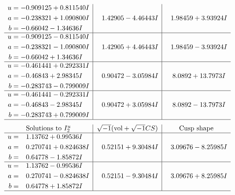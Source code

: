 \documentclass[1p]{elsarticle_modified}
\theoremstyle{definition}
\newcommand{\I}{\sqrt{-1}}
\begin{document}
$$\begin{array}{c|c|c}
\begin{aligned}
u &= -0.909125 + 0.811540 I \\
a &= -0.238321 + 1.090800 I \\
b &= -0.66042 - 1.34636 I\end{aligned}
 & \phantom{-}1.42905 - 4.46443 I & \phantom{-}1.98459 + 3.93924 I \\ \hline\begin{aligned}
u &= -0.909125 - 0.811540 I \\
a &= -0.238321 - 1.090800 I \\
b &= -0.66042 + 1.34636 I\end{aligned}
 & \phantom{-}1.42905 + 4.46443 I & \phantom{-}1.98459 - 3.93924 I \\ \hline\begin{aligned}
u &= -0.461441 + 0.292331 I \\
a &= -0.46843 + 2.98345 I \\
b &= -0.283743 - 0.799009 I\end{aligned}
 & \phantom{-}0.90472 - 3.05984 I & \phantom{-}8.0892 + 13.7973 I \\ \hline\begin{aligned}
u &= -0.461441 - 0.292331 I \\
a &= -0.46843 - 2.98345 I \\
b &= -0.283743 + 0.799009 I\end{aligned}
 & \phantom{-}0.90472 + 3.05984 I & \phantom{-}8.0892 - 13.7973 I\\
 \hline 
 \end{array}$$\newpage$$\begin{array}{c|c|c}  
\text{Solutions to }I^u_{2}& \I (\text{vol} + \sqrt{-1}CS) & \text{Cusp shape}\\
 \hline 
\begin{aligned}
u &= \phantom{-}1.13762 + 0.99536 I \\
a &= \phantom{-}0.270741 + 0.824638 I \\
b &= \phantom{-}0.64778 - 1.85872 I\end{aligned}
 & \phantom{-}0.52151 + 9.30484 I & \phantom{-}3.09676 - 8.25985 I \\ \hline\begin{aligned}
u &= \phantom{-}1.13762 - 0.99536 I \\
a &= \phantom{-}0.270741 - 0.824638 I \\
b &= \phantom{-}0.64778 + 1.85872 I\end{aligned}
 & \phantom{-}0.52151 - 9.30484 I & \phantom{-}3.09676 + 8.25985 I\\
 \hline 
 \end{array}$$\newpage\newpage\renewcommand{\arraystretch}{1}
\end{document}
